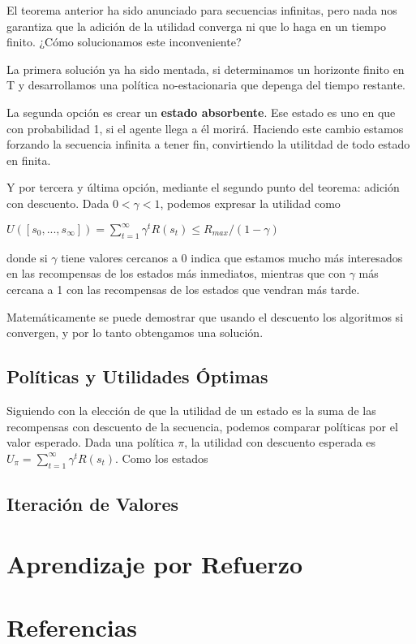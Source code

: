 \documentclass[12pt,a4paper,catalan, leqno]{article} %
\theoremstyle{definition}
\begin{document}
El teorema anterior ha sido anunciado para secuencias infinitas, pero nada nos garantiza que la adición de la utilidad converga ni que lo haga en un tiempo finito. ¿Cómo solucionamos este inconveniente?

La primera solución ya ha sido mentada, si determinamos un horizonte finito en T y desarrollamos una política no-estacionaria que depenga del tiempo restante.

La segunda opción es crear un \textbf{estado absorbente}. Ese estado es uno en que con probabilidad 1, si el agente llega a él morirá. Haciendo este cambio estamos forzando la secuencia infinita a tener fin, convirtiendo la utilitdad de todo estado en finita.

Y por tercera y última opción, mediante el segundo punto del teorema: adición con descuento.
Dada $0<\gamma<1$, podemos expresar la utilidad como
\begin{center}
    $U([s_0,...,s_\infty]) = \sum_{t=1}^{\infty} \gamma^t R(s_t) \leq R_{max}/(1-\gamma)$
\end{center}
donde si $\gamma$ tiene valores cercanos a 0 indica que estamos mucho más interesados en las recompensas de los estados más inmediatos, mientras que con $\gamma$ más cercana a 1 con las recompensas de los estados que vendran más tarde.

Matemáticamente se puede demostrar que usando el descuento los algoritmos si convergen, y por lo tanto obtengamos una solución.

\subsection{Políticas y Utilidades Óptimas}

Siguiendo con la elección de que la utilidad de un estado es la suma de las recompensas con descuento de la secuencia, podemos comparar políticas por el valor esperado. Dada una política $\pi$, la utilidad con descuento esperada es $U_\pi = \sum_{t=1}^{\infty} \gamma^t R(s_t)$. Como los estados

\subsection{Iteración de Valores}

\pagebreak
\section{Aprendizaje por Refuerzo}

\pagebreak
\section{Referencias}
\end{document}
